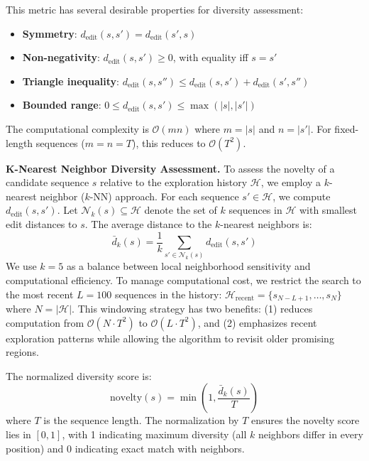 This metric has several desirable properties for diversity assessment:
\begin{itemize}
    \item \textbf{Symmetry}: $d_{\text{edit}}(s, s') = d_{\text{edit}}(s', s)$
    \item \textbf{Non-negativity}: $d_{\text{edit}}(s, s') \geq 0$, with equality iff $s = s'$
    \item \textbf{Triangle inequality}: $d_{\text{edit}}(s, s'') \leq d_{\text{edit}}(s, s') + d_{\text{edit}}(s', s'')$
    \item \textbf{Bounded range}: $0 \leq d_{\text{edit}}(s, s') \leq \max(|s|, |s'|)$
\end{itemize}

The computational complexity is $\mathcal{O}(mn)$ where $m = |s|$ and $n = |s'|$. For fixed-length sequences ($m = n = T$), this reduces to $\mathcal{O}(T^2)$.

\textbf{K-Nearest Neighbor Diversity Assessment.} To assess the novelty of a candidate sequence $s$ relative to the exploration history $\mathcal{H}$, we employ a $k$-nearest neighbor ($k$-NN) approach. For each sequence $s' \in \mathcal{H}$, we compute $d_{\text{edit}}(s, s')$. Let $\mathcal{N}_k(s) \subseteq \mathcal{H}$ denote the set of $k$ sequences in $\mathcal{H}$ with smallest edit distances to $s$. The average distance to the $k$-nearest neighbors is:
%
\begin{equation}
\bar{d}_k(s) = \frac{1}{k}\sum_{s' \in \mathcal{N}_k(s)} d_{\text{edit}}(s, s')
\end{equation}
%
We use $k = 5$ as a balance between local neighborhood sensitivity and computational efficiency. To manage computational cost, we restrict the search to the most recent $L = 100$ sequences in the history: $\mathcal{H}_{\text{recent}} = \{s_{N-L+1}, \ldots, s_N\}$ where $N = |\mathcal{H}|$. This windowing strategy has two benefits: (1) reduces computation from $\mathcal{O}(N \cdot T^2)$ to $\mathcal{O}(L \cdot T^2)$, and (2) emphasizes recent exploration patterns while allowing the algorithm to revisit older promising regions.

The normalized diversity score is:
%
\begin{equation}
\text{novelty}(s) = \min\left(1, \frac{\bar{d}_k(s)}{T}\right)
\end{equation}
%
where $T$ is the sequence length. The normalization by $T$ ensures the novelty score lies in $[0, 1]$, with 1 indicating maximum diversity (all $k$ neighbors differ in every position) and 0 indicating exact match with neighbors.

